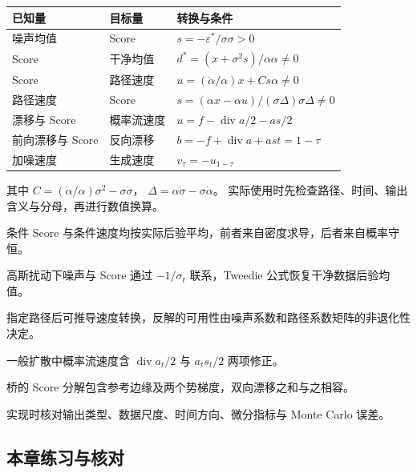 \begingroup
\small
\noindent
\begin{tabularx}{\textwidth}{@{}llX@{}}
\toprule
已知量 & 目标量 & 转换与条件 \\
\midrule
噪声均值 & Score & \(s=-\varepsilon^*/\sigma\)\newline \(\sigma>0\) \\
Score & 干净均值 & \(d^*=(x+\sigma^2s)/\alpha\)\newline \(\alpha\ne0\) \\
Score & 路径速度 & \(u=(\dot\alpha/\alpha)x+Cs\)\newline \(\alpha\ne0\) \\
路径速度 & Score & \(s=(\dot\alpha x-\alpha u)/(\sigma\Delta)\)\newline \(\sigma\Delta\ne0\) \\
漂移与 Score & 概率流速度 & \(u=f-\operatorname{div}a/2-as/2\) \\
前向漂移与 Score & 反向漂移 & \(b=-f+\operatorname{div}a+as\)\newline \(t=1-\tau\) \\
加噪速度 & 生成速度 & \(v_\tau=-u_{1-\tau}\) \\
\bottomrule
\end{tabularx}
\endgroup

其中 \(C=(\dot\alpha/\alpha)\sigma^2-\sigma\dot\sigma\)，
\(\Delta=\alpha\dot\sigma-\sigma\dot\alpha\)。
实际使用时先检查路径、时间、输出含义与分母，再进行数值换算。

\begin{chaptersummary}
 \item 条件 Score 与条件速度均按实际后验平均，前者来自密度求导，后者来自概率守恒。
 \item 高斯扰动下噪声与 Score 通过 \(-1/\sigma_t\) 联系，Tweedie 公式恢复干净数据后验均值。
 \item 指定路径后可推导速度转换，反解的可用性由噪声系数和路径系数矩阵的非退化性决定。
 \item 一般扩散中概率流速度含 \(\operatorname{div}a_t/2\) 与 \(a_ts_t/2\) 两项修正。
 \item 桥的 Score 分解包含参考边缘及两个势梯度，双向漂移之和与之相容。
 \item 实现时核对输出类型、数据尺度、时间方向、微分指标与 Monte Carlo 误差。
\end{chaptersummary}

\subsection*{本章练习与核对}

